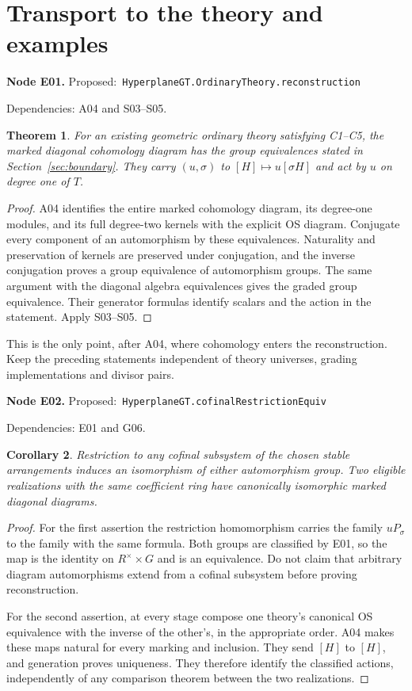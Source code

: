 \documentclass[11pt]{article}
\newtheorem{theorem}{Theorem}[section]
\newtheorem{corollary}[theorem]{Corollary}
\theoremstyle{remark}\newtheorem{remark}[theorem]{Remark}
\newcommand{\code}[1]{\nolinkurl{#1}}
\newcommand{\node}[3]{\par\Needspace{8\baselineskip}\smallskip\noindent\textbf{Node #1.}\quad
 \textsf{Proposed:}\ \code{#2}\par\noindent
 \textsf{Dependencies:} #3.\par\smallskip}
\begin{document}
\section{Transport to the theory and examples}

\node{E01}{HyperplaneGT.OrdinaryTheory.reconstruction}{A04 and S03--S05}
\begin{theorem}\label{thm:e01}
For an existing geometric ordinary theory satisfying C1--C5,
the marked diagonal cohomology diagram has the group equivalences
stated in Section~\ref{sec:boundary}. They carry $(u,\sigma)$
to $[H]\mapsto u[\sigma H]$ and act by $u$ on degree one of $T$.
\end{theorem}
\begin{proof}
A04 identifies the entire marked cohomology diagram, its
degree-one modules, and its full degree-two kernels with the
explicit OS diagram. Conjugate every component of an
automorphism by these equivalences. Naturality and preservation
of kernels are preserved under conjugation, and the inverse
conjugation proves a group equivalence of automorphism groups.
The same argument with the diagonal algebra equivalences gives
the graded group equivalence. Their generator formulas identify
scalars and the action in the statement. Apply S03--S05.
\end{proof}
This is the only point, after A04, where cohomology enters the
reconstruction. Keep the preceding statements independent of
theory universes, grading implementations and divisor pairs.

\node{E02}{HyperplaneGT.cofinalRestrictionEquiv}{E01 and G06}
\begin{corollary}\label{cor:e02}
Restriction to any cofinal subsystem of the chosen stable
arrangements induces an isomorphism of either automorphism
group. Two eligible realizations with the same coefficient
ring have canonically isomorphic marked diagonal diagrams.
\end{corollary}
\begin{proof}
For the first assertion the restriction homomorphism carries
the family $uP_\sigma$ to the family with the same formula.
Both groups are classified by E01, so the map is the identity
on $R^\times\times G$ and is an equivalence. Do not claim that
arbitrary diagram automorphisms extend from a cofinal subsystem
before proving reconstruction.

For the second assertion, at every stage compose one theory's
canonical OS equivalence with the inverse of the other's, in
the appropriate order. A04 makes these maps natural for every
marking and inclusion. They send $[H]$ to $[H]$, and generation
proves uniqueness. They therefore identify the classified
actions, independently of any comparison theorem between the
two realizations.
\end{proof}
\end{document}

